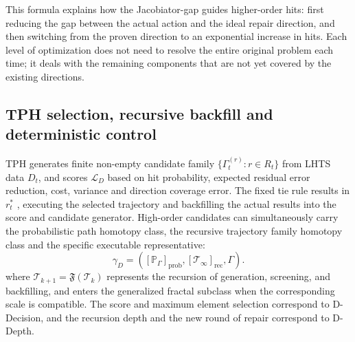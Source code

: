 \documentclass[11pt,a4paper]{article}
\theoremstyle{plain}
\theoremstyle{definition}
\theoremstyle{remark}
\begin{document}
\begin{CJK*}
This formula explains how the Jacobiator-gap guides higher-order hits: first reducing the gap between the actual action and the ideal repair direction, and then switching from the proven direction to an exponential increase in hits. Each level of optimization does not need to resolve the entire original problem each time; it deals with the remaining components that are not yet covered by the existing directions.

\subsection { TPH selection, recursive backfill and deterministic control }

TPH generates finite non-empty candidate family $\{\Gamma_t^{(r)}:r\in R_t\}$ from LHTS data $D_t$, and scores $\mathcal L_D$ based on hit probability, expected residual error reduction, cost, variance and direction coverage error. The fixed tie rule results in $r_t^*$ , executing the selected trajectory and backfilling the actual results into the score and candidate generator. High-order candidates can simultaneously carry the probabilistic path homotopy class, the recursive trajectory family homotopy class and the specific executable representative: \[
 \gamma_D=([\mathbb P_\Gamma]_{\mathrm{prob}},
           [\mathcal T_\infty]_{\mathrm{rec}},\Gamma).
\] where $\mathcal T_{k+1}=\mathfrak F(\mathcal T_k)$ represents the recursion of generation, screening, and backfilling, and enters the generalized fractal subclass when the corresponding scale is compatible. The score and maximum element selection correspond to D-Decision, and the recursion depth and the new round of repair correspond to D-Depth.


\end{CJK*}
\end{document}
